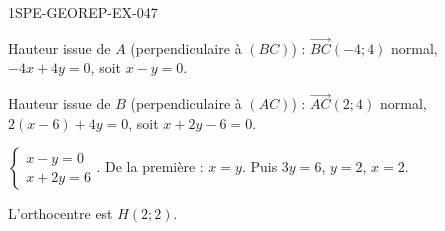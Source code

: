 \begin{corrige}{1SPE-GEOREP-EX-047}


Hauteur issue de $A$ (perpendiculaire à $(BC)$) : $\vec{BC}(-4 ; 4)$ normal, $-4x + 4y = 0$, soit $x - y = 0$.

Hauteur issue de $B$ (perpendiculaire à $(AC)$) : $\vec{AC}(2 ; 4)$ normal, $2(x-6) + 4y = 0$, soit $x + 2y - 6 = 0$.

$\begin{cases} x - y = 0 \\ x + 2y = 6 \end{cases}$. De la première : $x = y$. Puis $3y = 6$, $y = 2$, $x = 2$.

L'orthocentre est $\boxed{H(2 ; 2)}$.

\end{corrige}

